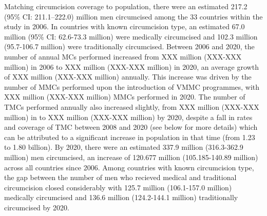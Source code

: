 \documentclass{article}
\begin{document}


Matching circumcision coverage to population, there were an estimated 217.2 (95\% CI: 211.1--222.0) million men circumcised among the 33 countries within the study in 2006. In countries with known circumcision type, an estimated 67.0 million (95\% CI: 62.6-73.3 million) were medically circumcised and 102.3 million (95.7-106.7 million) were traditionally circumcised. Between 2006 and 2020, the number of annual MCs performed increased from XXX million (XXX-XXX million) in 2006 to XXX million (XXX-XXX million) in 2020, an average growth of XXX million (XXX-XXX million) annually. This increase was driven by the number of MMCs performed upon the introduction of VMMC programmes, with XXX million (XXX-XXX million) MMCs performed in 2020. The number of TMCs performed annually also increased slightly, from XXX million (XXX-XXX million) in to XXX million (XXX-XXX million) by 2020, despite a fall in rates and coverage of TMC between 2008 and 2020 (see below for more details) which can be attributed to a significant increase in population in that time (from 1.23 to 1.80 billion).  By 2020, there were an estimated 337.9 million (316.3-362.9 million) men circumcised, an increase of 120.677 million (105.185-140.89 million) across all countries since 2006. Among countries with known circumcision type, the gap between the number of men who recieved medical and traditional circumcision closed considerably with 125.7 million (106.1-157.0 million) medically circumcised and 136.6 million (124.2-144.1 million) traditionally circumcised by 2020.
\end{document}
